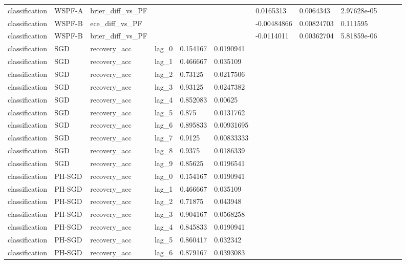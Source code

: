 \begin{tabular}{llllllllllll}
classification & WSPF-A & brier\_diff\_vs\_PF &  &  &  & 0.0165313 & 0.0064343 & 2.97628e-05 &  &  &  \\
classification & WSPF-B & ece\_diff\_vs\_PF &  &  &  & -0.00484866 & 0.00824703 & 0.111595 &  &  &  \\
classification & WSPF-B & brier\_diff\_vs\_PF &  &  &  & -0.0114011 & 0.00362704 & 5.81859e-06 &  &  &  \\
classification & SGD & recovery\_acc & lag\_0 & 0.154167 & 0.0190941 &  &  &  &  &  &  \\
classification & SGD & recovery\_acc & lag\_1 & 0.466667 & 0.035109 &  &  &  &  &  &  \\
classification & SGD & recovery\_acc & lag\_2 & 0.73125 & 0.0217506 &  &  &  &  &  &  \\
classification & SGD & recovery\_acc & lag\_3 & 0.93125 & 0.0247382 &  &  &  &  &  &  \\
classification & SGD & recovery\_acc & lag\_4 & 0.852083 & 0.00625 &  &  &  &  &  &  \\
classification & SGD & recovery\_acc & lag\_5 & 0.875 & 0.0131762 &  &  &  &  &  &  \\
classification & SGD & recovery\_acc & lag\_6 & 0.895833 & 0.00931695 &  &  &  &  &  &  \\
classification & SGD & recovery\_acc & lag\_7 & 0.9125 & 0.00833333 &  &  &  &  &  &  \\
classification & SGD & recovery\_acc & lag\_8 & 0.9375 & 0.0186339 &  &  &  &  &  &  \\
classification & SGD & recovery\_acc & lag\_9 & 0.85625 & 0.0196541 &  &  &  &  &  &  \\
classification & PH-SGD & recovery\_acc & lag\_0 & 0.154167 & 0.0190941 &  &  &  &  &  &  \\
classification & PH-SGD & recovery\_acc & lag\_1 & 0.466667 & 0.035109 &  &  &  &  &  &  \\
classification & PH-SGD & recovery\_acc & lag\_2 & 0.71875 & 0.043948 &  &  &  &  &  &  \\
classification & PH-SGD & recovery\_acc & lag\_3 & 0.904167 & 0.0568258 &  &  &  &  &  &  \\
classification & PH-SGD & recovery\_acc & lag\_4 & 0.845833 & 0.0190941 &  &  &  &  &  &  \\
classification & PH-SGD & recovery\_acc & lag\_5 & 0.860417 & 0.032342 &  &  &  &  &  &  \\
classification & PH-SGD & recovery\_acc & lag\_6 & 0.879167 & 0.0393083 &  &  &  &  &  &  \\

\end{tabular}
